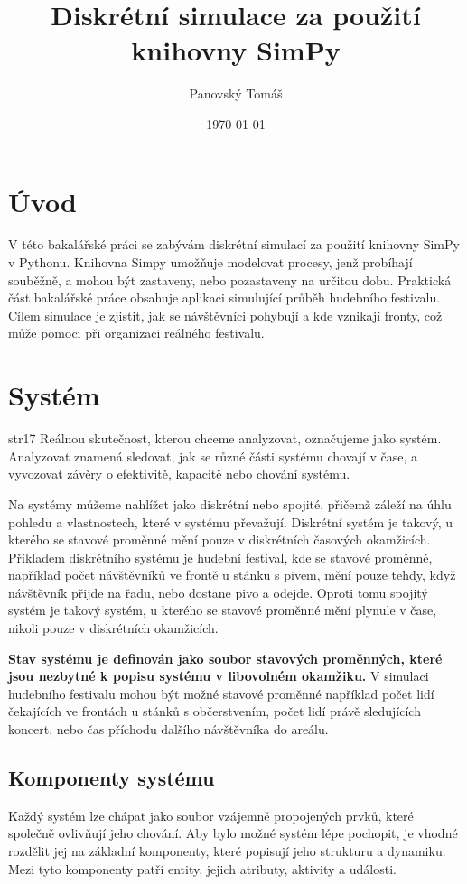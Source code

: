 \documentclass[12pt,a4paper]{article}
\title{Diskrétní simulace za použití knihovny SimPy}
\author{Panovský Tomáš}
\date{\today}
\begin{document}
\maketitle

\section{Úvod}
V této bakalářské práci se zabývám diskrétní simulací za použití knihovny SimPy v Pythonu. 
Knihovna Simpy umožňuje modelovat procesy, jenž probíhají souběžně, a mohou být zastaveny, nebo pozastaveny na určitou dobu. Praktická část bakalářské práce obsahuje aplikaci simulující průběh hudebního festivalu.
Cílem simulace je zjistit, jak se návštěvníci pohybují a kde vznikají 
fronty, což může pomoci při organizaci reálného festivalu.

\section{Systém} str17
Reálnou skutečnost, kterou chceme analyzovat, označujeme jako systém. Analyzovat znamená sledovat, jak se různé části systému chovají v čase, a vyvozovat závěry o efektivitě, kapacitě nebo chování systému.

Na systémy můžeme nahlížet jako diskrétní nebo spojité, přičemž záleží na úhlu pohledu a vlastnostech, které v systému převažují. Diskrétní systém je takový, u kterého se stavové proměnné mění pouze v diskrétních časových okamžicích. Příkladem diskrétního systému je hudební festival, kde se stavové proměnné, například počet návštěvníků ve frontě u stánku s pivem, mění pouze tehdy, když návštěvník přijde na řadu, nebo dostane pivo a odejde. Oproti tomu spojitý systém je takový systém, u kterého se stavové proměnné mění plynule v čase, nikoli pouze v diskrétních okamžicích.

{\bf Stav systému je definován jako soubor stavových proměnných, které jsou nezbytné k popisu systému v libovolném okamžiku.} V simulaci hudebního festivalu mohou být možné stavové proměnné například počet lidí čekajících ve frontách u stánků s občerstvením, počet lidí právě sledujících koncert, nebo čas příchodu dalšího návštěvníka do areálu.


\subsection{Komponenty systému}
Každý systém lze chápat jako soubor vzájemně propojených prvků, které společně ovlivňují jeho chování. Aby bylo možné systém lépe pochopit, je vhodné rozdělit jej na základní komponenty, které popisují jeho strukturu a dynamiku. Mezi tyto komponenty patří entity, jejich atributy, aktivity a události.
\end{document}
